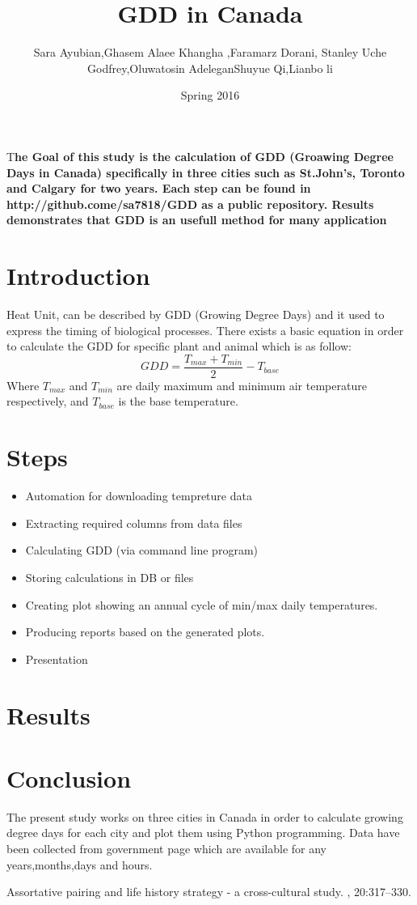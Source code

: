 \documentclass[DIV=calc, paper=a4, fontsize=11pt, twocolumn]{scrartcl}
\title{GDD in Canada}
\author{Sara Ayubian\affmark[1],Ghasem Alaee Khangha \affmark[1],Faramarz Dorani\affmark[1],
Stanley Uche Godfrey\affmark[1],Oluwatosin Adelegan\affmark[1]
Shuyue Qi\affmark[1],Lianbo li\affmark[1]}
\date{Spring 2016}
\newcommand{\initial}[1]{ 
\lettrine[lines=3,lhang=0.3,nindent=0em]{
\color{DarkGoldenrod}
{\textsf{#1}}}{}}
\begin{document}
\maketitle 
\thispagestyle{fancy} 
\initial{T}\textbf{he Goal of this study is the calculation of GDD (Groawing Degree Days in Canada) specifically in three cities such as St.John's, Toronto and Calgary for two years. Each step can be found in http://github.come/sa7818/GDD as a public repository. Results demonstrates that GDD is an usefull method for many application}
\section{Introduction}
Heat Unit, can be described by GDD (Growing Degree Days) and it used to express the timing of biological processes. There exists a basic equation in order to calculate the GDD for specific plant and animal which is as follow:
\begin{equation}
GDD =\frac {T_{max}+T_{min}}{2}-T_{base}
\end{equation}
Where $T_{max}$ and $T_{min}$ are daily maximum and minimum air temperature respectively, and $T_{base}$ is the base temperature.
\section{Steps}
\begin{itemize}
\item Automation for downloading tempreture data
\item Extracting required columns from data files
\item Calculating GDD (via command line program)
\item Storing calculations in DB or files
\item Creating plot showing an annual cycle of min/max daily temperatures.
\item Producing reports based on the generated plots.
\item Presentation
\end{itemize}
\section{Results}
\section{Conclusion}
The present study works on three cities in Canada in order to calculate growing degree days for each city and plot them using Python programming. Data have been collected from government page which are available for any years,months,days and hours.
\begin{thebibliography}{99}
\newblock Assortative pairing and life history strategy - a cross-cultural
  study.
, 20:317--330.
 \end{thebibliography}
\end{document}

